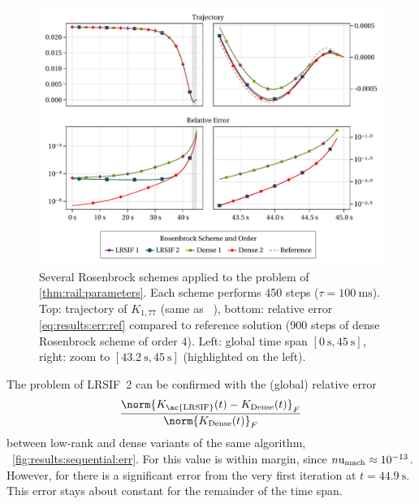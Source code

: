 \begin{figure}[tp]
  \includegraphics[width=\textwidth]{figures/fig_results_sequential.pdf}
  \caption[Rosenbrock method applied to Rail problem]{%
    Several Rosenbrock schemes applied to the problem of \autoref{thm:rail:parameters}.
    Each scheme performs 450 steps ($\tau = \SI{100}{\milli\second}$).
    Top: trajectory of $K_{1,77}$ (same as \citeauthor*{Lang2015}~\cite[Fig.~1]{Lang2015}),
    bottom: relative error \eqref{eq:results:err:ref} compared to reference solution
    (900 steps of dense Rosenbrock scheme of order 4).
    Left: global time span $[\SI{0}{\second}, \SI{45}{\second}]$,
    right: zoom to $[\SI[round-mode=off]{43.2}{\second}, \SI{45}{\second}]$ (highlighted on the left).
  }
  \label{fig:results:sequential:rail}
\end{figure}

The problem of \ac{LRSIF}~2 can be confirmed with the (global) relative error
\begin{equation}
\label{eq:results:err:lr_v_dense}
  \frac{\norm{K_\text{\ac{LRSIF}}(t) - K_\text{Dense}(t)}_F}{\norm{K_\text{Dense}(t)}_F}
\end{equation}
between low-rank and dense variants of the same algorithm,
\cf~\autoref{fig:results:sequential:err}.
For  this value is within margin,
since $n \mathrm u_\text{mach} \approx 10^{-13}$.
However, for  there is a significant error from the very first iteration at $t=\SI[round-precision=1]{44.9}{\second}$.
This error stays about constant for the remainder of the time span.

